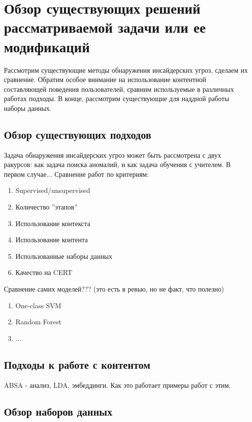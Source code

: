 \section{Обзор существующих решений рассматриваемой зада­чи или ее модификаций}
Рассмотрим существующие методы обнаружения инсайдерских угроз, сделаем их сравнение. Обратим особое внимание на использование контентной составляющей поведения пользователей, сравним используемые в различных работах подходы. В конце, рассмотрим существующие для наддной работы наборы данных.
\subsection{Обзор существующих подходов}
Задача обнаружения инсайдерских угроз может быть рассмотрена с двух ракурсов: как задача поиска аномалий, и как задача обучения с учителем.
В первом случае...
Сравнение работ по критериям:
\begin{enumerate}
\item Supervised/unsupervised
\item Количество ''этапов''
\item Использование контекста
\item Использование контента
\item Использованные наборы данных
\item Качество на CERT
\end{enumerate}
Сравнение самих моделей??? (это есть в ревью, но не факт, что полезно)
\begin{enumerate}
\item One-class SVM
\item Random Forest
\item ...
\end{enumerate}
\subsection{Подходы к работе с контентом}
ABSA - анализ, LDA, эмбеддинги. Как это работает примеры работ с этим.
\subsection{Обзор наборов данных}
\clearpage